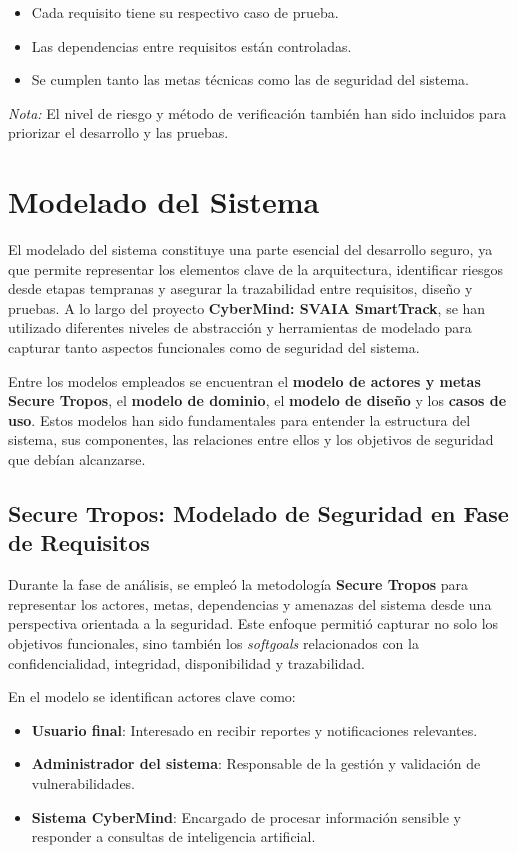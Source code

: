 \documentclass[11pt]{article}
\begin{document}
\begin{itemize}
    \item Cada requisito tiene su respectivo caso de prueba.
    \item Las dependencias entre requisitos están controladas.
    \item Se cumplen tanto las metas técnicas como las de seguridad del sistema.
\end{itemize}

\textit{Nota:} El nivel de riesgo y método de verificación también han sido incluidos para priorizar el desarrollo y las pruebas.

\section{Modelado del Sistema}

El modelado del sistema constituye una parte esencial del desarrollo seguro, ya que permite representar los elementos clave de la arquitectura, identificar riesgos desde etapas tempranas y asegurar la trazabilidad entre requisitos, diseño y pruebas. A lo largo del proyecto \textbf{CyberMind: SVAIA SmartTrack}, se han utilizado diferentes niveles de abstracción y herramientas de modelado para capturar tanto aspectos funcionales como de seguridad del sistema.

Entre los modelos empleados se encuentran el \textbf{modelo de actores y metas Secure Tropos}, el \textbf{modelo de dominio}, el \textbf{modelo de diseño} y los \textbf{casos de uso}. Estos modelos han sido fundamentales para entender la estructura del sistema, sus componentes, las relaciones entre ellos y los objetivos de seguridad que debían alcanzarse.

\subsection{Secure Tropos: Modelado de Seguridad en Fase de Requisitos}

Durante la fase de análisis, se empleó la metodología \textbf{Secure Tropos} para representar los actores, metas, dependencias y amenazas del sistema desde una perspectiva orientada a la seguridad. Este enfoque permitió capturar no solo los objetivos funcionales, sino también los \textit{softgoals} relacionados con la confidencialidad, integridad, disponibilidad y trazabilidad.

En el modelo se identifican actores clave como:

\begin{itemize}
    \item \textbf{Usuario final}: Interesado en recibir reportes y notificaciones relevantes.
    \item \textbf{Administrador del sistema}: Responsable de la gestión y validación de vulnerabilidades.
    \item \textbf{Sistema CyberMind}: Encargado de procesar información sensible y responder a consultas de inteligencia artificial.
\end{itemize}
\end{document}
